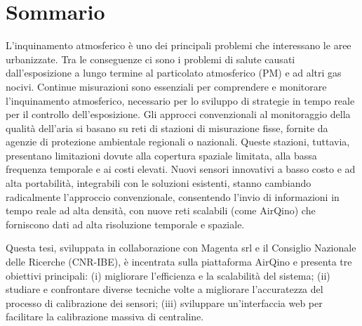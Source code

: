 \chapter{Sommario}\label{ch:sommario}

L'inquinamento atmosferico è uno dei principali problemi che interessano le aree urbanizzate. Tra le conseguenze ci sono i problemi di salute causati dall'esposizione a lungo termine al particolato atmosferico (PM) e ad altri gas nocivi. Continue misurazioni sono essenziali per comprendere e monitorare l'inquinamento atmosferico, necessario per lo sviluppo di strategie in tempo reale per il controllo dell'esposizione.
Gli approcci convenzionali al monitoraggio della qualità dell'aria si basano su reti di stazioni di misurazione fisse, fornite da agenzie di protezione ambientale regionali o nazionali.
Queste stazioni, tuttavia, presentano limitazioni dovute alla copertura spaziale limitata, alla bassa frequenza temporale e ai costi elevati.
Nuovi sensori innovativi a basso costo e ad alta portabilità, integrabili con le soluzioni esistenti, stanno cambiando radicalmente l'approccio convenzionale, consentendo l'invio di informazioni in tempo reale ad alta densità, con nuove reti scalabili (come AirQino) che forniscono dati ad alta risoluzione temporale e spaziale.

Questa tesi, sviluppata in collaborazione con Magenta srl e il Consiglio Nazionale delle Ricerche (CNR-IBE), è incentrata sulla piattaforma AirQino e presenta tre obiettivi principali: (i) migliorare l'efficienza e la scalabilità del sistema; (ii) studiare e confrontare diverse tecniche volte a migliorare l'accuratezza del processo di calibrazione dei sensori; (iii) sviluppare un'interfaccia web per facilitare la calibrazione massiva di centraline.